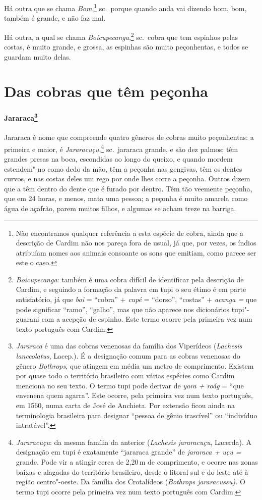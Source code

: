  Há outra que se chama \textit{Bom},\footnote{ Não encontramos qualquer
referência a esta espécie de cobra, ainda que a descrição de Cardim não
nos pareça fora de usual, já que, por vezes, os índios atribuíam nomes
aos animais consoante os sons que emitiam, como parece ser este o caso.}
sc.~porque quando anda vai dizendo bom, bom, também é grande, e não faz mal.

 Há outra, a qual se chama \textit{Boicupecanga},\footnote{ \textit{
Boicupecanga}: também é uma cobra difícil de identificar pela
descrição de Cardim, e seguindo a formação da palavra em tupi o seu
étimo é em parte satisfatório, já que \textit{boi} = ``cobra'' +
\textit{cupé} = ``dorso'', ``costas'' + \textit{acanga =} que pode
significar ``ramo'', ``galho'', mas que não aparece nos dicionários 
tupi"-guarani com a acepção de espinho. Este termo ocorre pela primeira
vez num texto português com Cardim.} sc.~cobra que tem espinhos pelas
costas, é muito grande, e grossa, as espinhas são muito peçonhentas, e
todos se guardam muito delas.

\section{Das cobras que têm peçonha}
\paragraph{Jararaca\footnote{ \textit{Jararaca} é uma das cobras
venenosas da família dos Viperídeos (\textit{Lachesis lanceolatus}, 
Lacep.). É a designação comum para as cobras venenosas do gênero
\textit{Bothrops}, que atingem em média um metro de comprimento.
Existem por quase todo o território brasileiro com várias espécies como
Cardim menciona no seu texto. O termo tupi pode derivar de \textit{yara
+ roág} = ``que envenena quem agarra''. Este ocorre, pela primeira vez 
num texto português, em 1560, numa carta de José de Anchieta.
Por extensão ficou ainda na terminologia brasileira para designar
``pessoa de gênio irascível'' ou ``indivíduo intratável''.}}
Jararaca é nome que compreende quatro gêneros de cobras muito
peçonhentas: a primeira e maior, é \textit{Jararacuçu},\footnote{ \textit{Jararacuçu}: 
da mesma família da anterior (\textit{Lachesis
jararacuçu}, Lacerda). A designação em tupi é exatamente ``jararaca
grande'' de \textit{jararaca + uçu =} grande. Pode vir a atingir cerca
de 2,20\,m de comprimento, e ocorre nas zonas baixas e alagadas do
território brasileiro, desde o litoral sul e do leste até à região
centro"-oeste. Da família dos Crotalídeos (\textit{Bothrops
jararacussu).} O termo tupi ocorre pela primeira vez num texto português
com Cardim.} sc.~jararaca grande, e são dez palmos; têm grandes presas
na boca, escondidas ao longo do queixo, e quando mordem estendem"-no
como dedo da mão, têm a peçonha nas gengivas, têm os dentes curvos, e
nas costas deles um rego por onde lhes corre a peçonha. Outros dizem
que a têm dentro do dente que é furado por dentro. Têm tão veemente
peçonha, que em 24 horas, e menos, mata uma pessoa; a peçonha é muito
amarela como água de açafrão, parem muitos filhos, e algumas se acham
treze na barriga.

